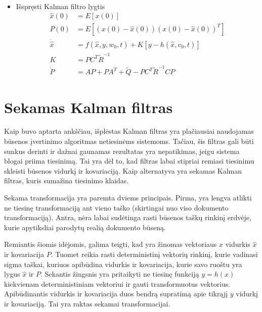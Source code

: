 \documentclass[12pt, a4paper, lithuanian]{article}
\begin{document}
\begin{itemize}
\begin{equation}
\begin{aligned}
                    \end{aligned}
                \end{equation}
                \item Išspręsti Kalman filtro lygtis
                \begin{equation}
                    \begin{aligned}
                        \hat{x}(0) &= E[x(0)]  \\
                        P(0) &= E[ (x(0) - \hat{x}(0))(x(0) - \hat{x}(0))^T ] \\
                        \dot{\hat{x}} &= f(\hat{x}, y, w_0, t) + K[y - h(\hat{x}, v_0, t)] \\
                        K &= PC^T\tilde{R}^{-1} \\
                        \dot{P} &= AP + PA^T + \tilde{Q} - PC^T\tilde{R}^{-1}CP
                    \end{aligned}
                \end{equation}
            \end{itemize}


    \section{Sekamas Kalman filtras}


    Kaip buvo aptarta ankščiau, išplėstas Kalman filtras yra plačiausiai naudojamas būsenos įvertinimo algoritmas netiesinėms sistemoms.
    Tačiau, šis filtras gali būti sunkus derinti ir dažnai gaunamas rezultatas yra nepatikimas, jeigu sistema blogai priima tiesinimą.
    Tai yra dėl to, kad filtras labai stipriai remiasi tiesinimu skleisti būsenos vidurkį ir kovariaciją.
    Kaip alternatyva yra sekamas Kalman filtras, kuris sumažina tiesinimo klaidas.

    Sekama transformacija yra paremta dviems principais.
    Pirma, yra lengva atlikti ne tiesinę transformaciją ant vieno taško (skirtingai nuo viso dokumento transformaciją).
    Antra, nėra labai sudėtinga rasti būsenos taškų rinkinį erdvėje, kurie apytiksliai parodytų realią dokumento būseną.

    Remiantis šiomis idėjomis, galima teigti, kad yra žinomas vektoriaus $x$ vidurkis $\hat{x}$ ir kovariacija $P$.
    Tuomet reikia rasti deterministinį vektorių rinkinį, kurie vadinasi sigma taškai, kuriuos apibūdina vidurkis ir kovariacija, kurie savo ruoštu yra lygus $\hat{x}$ ir $P$.
    Sekantis žingsnis yra pritaikyti ne tiesinę funkciją $y = h(x)$ kiekvienam deterministiniam vektoriui ir gauti transformuotus vektorius.
    Apibūdinantis vidurkis ir kovariacija duos bendrą supratimą apie tikrąjį $y$ vidurkį ir kovariaciją.
    Tai yra raktas sekamai transformacijai.
\end{document}
